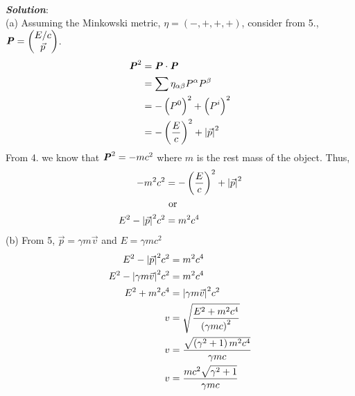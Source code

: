 \documentclass[10pt,a4paper]{article}
\theoremstyle{break}
\begin{document}
\begin{enumerate}
\begin{enumerate}
      \end{enumerate}
      \newline\\
      \textbf{\textit{Solution}}:
      \newline\\
      (a) Assuming the Minkowski metric, $\eta = (-,+,+,+)$, consider from 5., $\textbf{\textit{P}} = \begin{pmatrix}
        E/c\\
        \Vec{p}
      \end{pmatrix}$.
      \begin{equation*}
          \begin{split}
              \textbf{\textit{P}}^2 &= \textbf{\textit{P}} \cdot \textbf{\textit{P}}\\
                &= \sum \eta_{\alpha \beta}P^{\alpha}P^{\beta}\\
                &= -\left(P^0\right)^2 + \left(P^i\right)^2\\
                &= -\left(\frac{E}{c}\right)^2 + \abs{\Vec{p}}^2
          \end{split}
      \end{equation*}
      From 4. we know that $\textbf{\textit{P}}^2 = -mc^2$ where $m$ is the rest mass of the object. Thus,
      \begin{equation*}
        \begin{split}
          -m^2c^2 &= -\left(\frac{E}{c}\right)^2 + \abs{\Vec{p}}^2\\
          &\text{ or }\\
          E^2 - \abs{\Vec{p}}^2c^2 &= m^2c^4
        \end{split}
      \end{equation*}
      (b) From 5, $\Vec{p} = \gamma m \Vec{v}$ and $E = \gamma mc^2$
      \begin{equation*}
            \begin{split}
              E^2 - \abs{\Vec{p}}^2c^2 &= m^2c^4\\
              E^2 - \abs{\gamma m\Vec{v}}^2c^2 &= m^2c^4\\
              E^2 + m^2c^4 &= \abs{\gamma m\Vec{v}}^2c^2\\
              v &= \sqrt{\frac{E^2 + m^2c^4}{\left(\gamma mc\right)^2}}\\
              v &= \frac{\sqrt{\left(\gamma^2 + 1\right)m^2c^4}}{\gamma mc}\\
              v &= \frac{mc^2\sqrt{\gamma^2+1}}{\gamma mc}\\

\end{split}
\end{equation*}
\end{enumerate}
\end{document}
